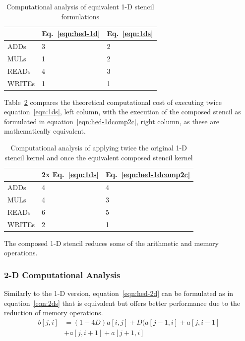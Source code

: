 \documentclass{acm_proc_article-sp}
\begin{document}
\begin{table}[ht]
  \begin{center}
    \begin{tabular}{| l | l | l |}
      \hline
       & Eq.~\eqref{eqn:hed-1d} & Eq.~\ref{eqn:1ds} \\ \hline
      ADDs   & 3 & 2 \\ \hline
      MULs   & 1 & 2 \\ \hline
      READs  & 4 & 3 \\ \hline
      WRITEs & 1 & 1 \\ \hline
    \end{tabular}
    \caption{Computational analysis of equivalent 1-D stencil formulations}
    \label{tbl:1d-s01a}
  \end{center}
\end{table}

Table~\ref{tbl:1d-s02a} compares the theoretical computational cost of executing twice equation~\eqref{eqn:1ds}, left column, with the execution of the composed stencil as formulated in equation~\eqref{eqn:hed-1dcomp2c}, right column, as these are mathematically equivalent.

\begin{table}[ht]
\begin{center}
  \begin{tabular}{| l | l | l |} \hline
     & 2x Eq.~\eqref{eqn:1ds} & Eq.~\eqref{eqn:hed-1dcomp2c} \\ \hline
    ADDs   & 4 & 4 \\ \hline
    MULs   & 4 & 3 \\ \hline
    READs  & 6 & 5 \\ \hline
    WRITEs & 2 & 1  \\ \hline
  \end{tabular}
    \caption{Computational analysis of applying twice the original 1-D stencil kernel and once the equivalent composed stencil kernel}
    \label{tbl:1d-s02a}
\end{center}
\end{table}
The composed 1-D stencil reduces some of the arithmetic and memory operations.


\subsubsection{2-D Computational Analysis}
Similarly to the 1-D version, equation~\eqref{eqn:hed-2d} can be formulated as in equation~\eqref{eqn:2ds} that is equivalent but offers better performance due to the reduction of memory operations.
\begin{equation}
  \begin{split}
    b[j,i] &= (1-4D)a[i,j] + D(a[j-1,i] + a[j,i-1]\\
    &+ a[j,i+1] + a[j+1,i]
  \end{split}
  \label{eqn:2ds}
\end{equation}
\end{document}
